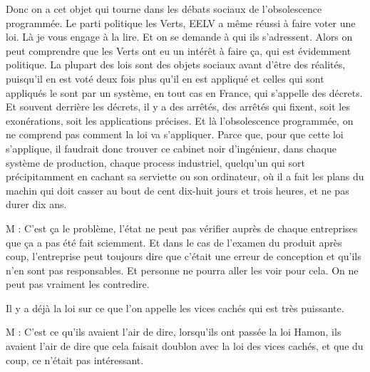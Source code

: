 \begin{description}
Donc on a cet objet qui tourne dans les débats sociaux de l'obsolescence programmée. Le parti politique les Verts, EELV a même réussi à faire voter une loi. Là je vous engage à la lire. Et on se demande à qui ils s'adressent. Alors on peut comprendre que les Verts ont eu un intérêt à faire ça, qui est évidemment politique. La plupart des lois sont des objets sociaux avant d'être des réalités, puisqu'il en est voté deux fois plus qu'il en est appliqué et celles qui sont appliqués le sont par un système, en tout cas en France, qui s'appelle des décrets. Et souvent derrière les décrets, il y a des arrêtés, des arrêtés qui fixent, soit les exonérations, soit les applications précises. Et là l'obsolescence programmée, on ne comprend pas comment la loi va s'appliquer. Parce que, pour que cette loi s'applique, il faudrait donc trouver ce cabinet noir d'ingénieur, dans chaque système de production, chaque process industriel, quelqu'un qui sort précipitamment en cachant sa serviette ou son ordinateur, où il a fait les plans du machin qui doit casser au bout de cent dix-huit jours et trois heures, et ne pas durer dix ans.

\vspace{1\baselineskip}

M : C'est ça le problème, l'état ne peut pas vérifier auprès de chaque entreprises que ça a pas été fait sciemment. Et dans le cas de l'examen du produit après coup, l'entreprise peut toujours dire que c'était une erreur de conception et qu’ils n’en sont pas responsables. Et personne ne pourra aller les voir pour cela. On ne peut pas vraiment les contredire.

\vspace{1\baselineskip}

Il y a déjà la loi sur ce que l'on appelle les vices cachés qui est très puissante.

\vspace{1\baselineskip}

M : C'est ce qu'ils avaient l'air de dire, lorsqu'ils ont passée la loi Hamon, ils avaient l'air de dire que cela faisait doublon avec la loi des vices cachés, et que du coup, ce n'était pas intéressant.

\vspace{1\baselineskip}


\end{description}
